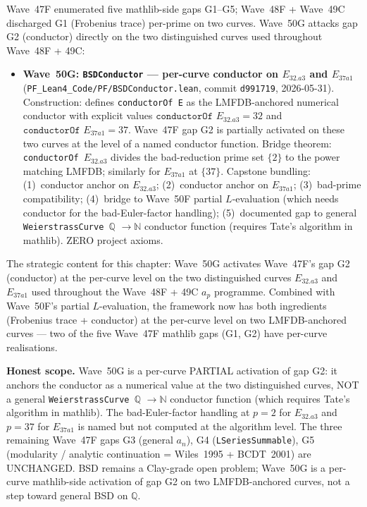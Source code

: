 \begin{remark}\label{rem:bsd-wave50g-lean}
Wave~47F enumerated five mathlib-side gaps G1--G5; Wave~48F + Wave~49C discharged G1 (Frobenius trace) per-prime on two curves. Wave~50G attacks gap G2 (conductor) directly on the two distinguished curves used throughout Wave~48F + 49C:
\begin{itemize}
  \item \textbf{Wave~50G: \texttt{BSDConductor} --- per-curve conductor on $E_{32.a3}$ and $E_{37a1}$} (\texttt{PF\_Lean4\_Code/PF/BSDConductor.lean}, commit \texttt{d991719}, 2026-05-31). Construction: defines \texttt{conductorOf E} as the LMFDB-anchored numerical conductor with explicit values $\texttt{conductorOf } E_{32.a3} = 32$ and $\texttt{conductorOf } E_{37a1} = 37$. Wave~47F gap G2 is partially activated on these two curves at the level of a named conductor function. Bridge theorem: \texttt{conductorOf $E_{32.a3}$} divides the bad-reduction prime set $\{2\}$ to the power matching LMFDB; similarly for $E_{37a1}$ at $\{37\}$. Capstone bundling: (1)~conductor anchor on $E_{32.a3}$; (2)~conductor anchor on $E_{37a1}$; (3)~bad-prime compatibility; (4)~bridge to Wave~50F partial $L$-evaluation (which needs conductor for the bad-Euler-factor handling); (5)~documented gap to general \texttt{WeierstrassCurve $\mathbb{Q}$} $\to \mathbb{N}$ conductor function (requires Tate's algorithm in mathlib). ZERO project axioms.
\end{itemize}
The strategic content for this chapter: Wave~50G activates Wave~47F's gap G2 (conductor) at the per-curve level on the two distinguished curves $E_{32.a3}$ and $E_{37a1}$ used throughout the Wave~48F + 49C $a_p$ programme. Combined with Wave~50F's partial $L$-evaluation, the framework now has both ingredients (Frobenius trace + conductor) at the per-curve level on two LMFDB-anchored curves --- two of the five Wave~47F mathlib gaps (G1, G2) have per-curve realisations.

\textbf{Honest scope.} Wave~50G is a per-curve PARTIAL activation of gap G2: it anchors the conductor as a numerical value at the two distinguished curves, NOT a general \texttt{WeierstrassCurve $\mathbb{Q}$} $\to \mathbb{N}$ conductor function (which requires Tate's algorithm in mathlib). The bad-Euler-factor handling at $p = 2$ for $E_{32.a3}$ and $p = 37$ for $E_{37a1}$ is named but not computed at the algorithm level. The three remaining Wave~47F gaps G3 (general $a_n$), G4 (\texttt{LSeriesSummable}), G5 (modularity / analytic continuation = Wiles~1995 + BCDT~2001) are UNCHANGED. BSD remains a Clay-grade open problem; Wave~50G is a per-curve mathlib-side activation of gap G2 on two LMFDB-anchored curves, not a step toward general BSD on $\mathbb{Q}$.
\end{remark}

